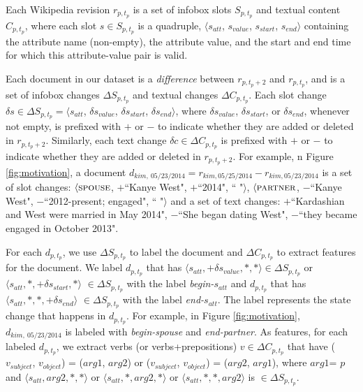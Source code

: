 Each Wikipedia revision $r_{p, t_p}$ is a set of infobox slots $S_{p, t_p}$ and textual content $C_{p, t_p}$, where each slot $s \in S_{p, t_p}$ is a quadruple, $\langle s_{att}$, $s_{value}$,  $s_{start}$, $s_{end} \rangle$ containing the attribute name (non-empty), the attribute value, and the start and end time for which this attribute-value pair is valid. 

Each document in our dataset is a \textit{difference} between $r_{p, t_p+2}$ and $r_{p, t_p}$, and is a set of infobox changes $\Delta S_{p, t_p}$ and textual changes $\Delta C_{p, t_p}$. Each slot change $\delta s \in \Delta S_{p, t_p} = \langle s_{att}$, $\delta s_{value}$,  $\delta s_{start}$, $\delta s_{end} \rangle$, where $\delta s_{value}$,  $\delta s_{start}$, or $\delta s_{end}$, whenever not empty, is prefixed with $+$ or $-$ to indicate whether they are added or deleted in $r_{p, t_p+2}$. Similarly, each text change $\delta c \in \Delta C_{p, t_p}$ is prefixed with $+$ or $-$ to indicate whether they are added or deleted in $r_{p, t_p+2}$. For example, n Figure \ref{fig:motivation}, a document $d_{kim,\ 05/23/2014} = r_{kim, 05/25/2014} - r_{kim, 05/23/2014}$ is a set of slot changes: $\langle\textsc{spouse}$, \textbf{$+$}\footnotesize ``Kanye West"\normalsize,  $+$\footnotesize ``2014"\normalsize, \footnotesize`` "\normalsize$\rangle$, $\langle\textsc{partner}$, $-$\footnotesize``Kanye West"\normalsize,  $-$\footnotesize``2012-present; engaged"\normalsize, \footnotesize`` "\normalsize$\rangle$ and a set of text changes: $+$\footnotesize``Kardashian and West were married in May 2014"\normalsize, $-$\footnotesize``She began dating West"\normalsize, $-$\footnotesize``they became engaged in October 2013"\normalsize.

For each $d_{p, t_p}$, we use $\Delta S_{p, t_p}$ to label the document and $\Delta C_{p, t_p}$ to extract features for the document. We label $d_{p, t_p}$ that has $\langle s_{att}, +\delta s_{value}, *, *\rangle \in \Delta S_{p, t_p}$ or $\langle s_{att}, *, +\delta s_{start}, *\rangle$ $\in \Delta S_{p, t_p}$ with the label \textit{begin-}$s_{att}$ and $d_{p, t_p}$ that has $\langle s_{att}, *, *, +\delta s_{end}\rangle$ $\in \Delta S_{p, t_p}$ with the label \textit{end-}$s_{att}$. The label represents the state change that happens in $d_{p, t_p}$. For example, in Figure \ref{fig:motivation}, $d_{kim,\ 05/23/2014}$ is labeled with \textit{begin-spouse} and \textit{end-partner}. As features, for each labeled $d_{p,t_p}$, we extract verbs (or verbs+prepositions) $v \in \Delta C_{p, t_p}$ that have ($v_{subject}$, $v_{object}$) = (\scriptsize$arg1$\normalsize, \scriptsize$arg2$\normalsize) or ($v_{subject}$, $v_{object}$) = (\scriptsize$arg2$\normalsize,  \scriptsize$arg1$\normalsize), where \scriptsize$arg1$\normalsize = $p$ and $\langle s_{att}, $\scriptsize$arg2$\normalsize$, *, *\rangle$ or $\langle s_{att}, *, $\scriptsize$arg2$\normalsize$, *\rangle$ or $\langle s_{att}, *, *, $\scriptsize$arg2$\normalsize$\rangle$ is $\in \Delta S_{p, t_p}$.

